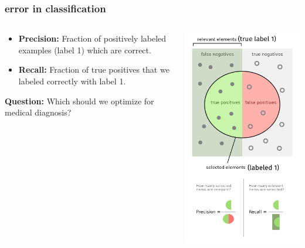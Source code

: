 \documentclass[handout,compress]{beamer}
\begin{document}
\begin{frame}
	\frametitle{error in classification}
	\begin{columns}
		\begin{column}{.5\textwidth}
			\begin{itemize}
				\item \textbf{Precision:} Fraction of positively labeled examples (label 1) which are correct.
				\item \textbf{Recall:} Fraction of true positives that we labeled correctly with label 1.
			\end{itemize}
		
		\vspace{1em}
		\textbf{Question:} Which should we optimize for medical diagnosis?
		\end{column}
		\begin{column}{.5\textwidth}
			\vspace{1em}
			
			\includegraphics[width=.8\textwidth]{precision_recall.png}
		\end{column}
	\end{columns}
\end{frame}
\end{document}
